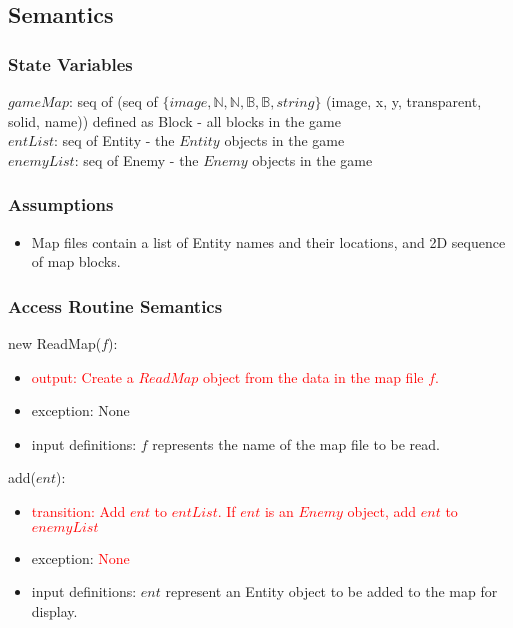 \documentclass[12pt]{article}
\newcommand{\Implies}{\Rightarrow}
\begin{document}
\subsection*{Semantics}

\subsubsection*{State Variables}

$gameMap$: seq of (seq of $\{ image, \mathbb{N}, \mathbb{N}, \mathbb{B}, \mathbb{B}, string \}$ (image, x, y, transparent, solid, name)) defined as Block - all blocks in the game\\
$entList$: seq of Entity - the $Entity$ objects in the game\\
$enemyList$: seq of Enemy - the $Enemy$ objects in the game

\subsubsection*{Assumptions}

\begin{itemize}
    \item Map files contain a list of Entity names and their locations, and 2D sequence of map blocks.
\end{itemize}

\subsubsection*{Access Routine Semantics}

new ReadMap($f$):
\begin{itemize}
    \item \textcolor{red}{output: Create a $ReadMap$ object from the data in the map file $f$.}
    \item exception: None
    \item input definitions: $f$ represents the name of the map file to be read.
\end{itemize}

\noindent add($ent$):
\begin{itemize}
    \item \textcolor{red}{transition: Add $ent$ to $entList$. If $ent$ is an $Enemy$ object, add $ent$ to $enemyList$}
    \item exception: \textcolor{red}{None}
    \item input definitions: $ent$ represent an Entity object to be added to the map for display.
\end{itemize}
\end{document}
